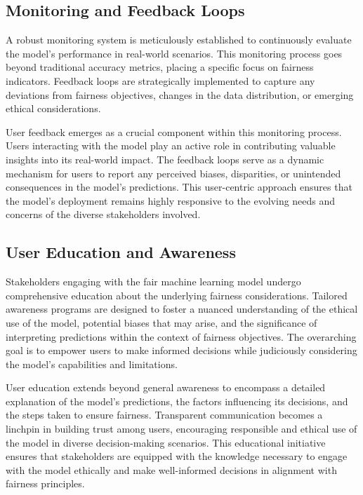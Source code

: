\subsection{Monitoring and Feedback Loops}

A robust monitoring system is meticulously established to continuously evaluate the model's performance in real-world scenarios. This monitoring process goes beyond traditional accuracy metrics, placing a specific focus on fairness indicators. Feedback loops are strategically implemented to capture any deviations from fairness objectives, changes in the data distribution, or emerging ethical considerations.

User feedback emerges as a crucial component within this monitoring process. Users interacting with the model play an active role in contributing valuable insights into its real-world impact. The feedback loops serve as a dynamic mechanism for users to report any perceived biases, disparities, or unintended consequences in the model's predictions. This user-centric approach ensures that the model's deployment remains highly responsive to the evolving needs and concerns of the diverse stakeholders involved.

\subsection{User Education and Awareness}

Stakeholders engaging with the fair machine learning model undergo comprehensive education about the underlying fairness considerations. Tailored awareness programs are designed to foster a nuanced understanding of the ethical use of the model, potential biases that may arise, and the significance of interpreting predictions within the context of fairness objectives. The overarching goal is to empower users to make informed decisions while judiciously considering the model's capabilities and limitations.

User education extends beyond general awareness to encompass a detailed explanation of the model's predictions, the factors influencing its decisions, and the steps taken to ensure fairness. Transparent communication becomes a linchpin in building trust among users, encouraging responsible and ethical use of the model in diverse decision-making scenarios. This educational initiative ensures that stakeholders are equipped with the knowledge necessary to engage with the model ethically and make well-informed decisions in alignment with fairness principles.

